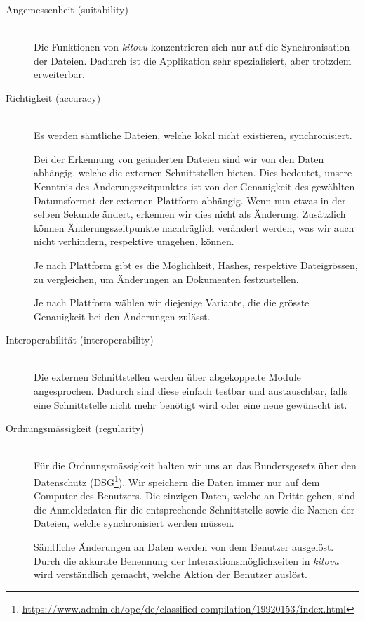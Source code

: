 \documentclass[a4paper]{article}
\begin{document}
\begin{description}
  \item[Angemessenheit (suitability)] \strut \\
    Die Funktionen von \emph{kitovu} konzentrieren sich nur auf die Synchronisation der Dateien.
    Dadurch ist die Applikation sehr spezialisiert, aber trotzdem erweiterbar.
  \item[Richtigkeit (accuracy)] \strut \\
    Es werden sämtliche Dateien, welche lokal nicht existieren, synchronisiert.

    Bei der Erkennung von geänderten Dateien sind wir von den Daten abhängig, welche die externen Schnittstellen bieten.
    Dies bedeutet, unsere Kenntnis des Änderungszeitpunktes ist von der Genauigkeit des gewählten Datumsformat der externen Plattform abhängig.
    Wenn nun etwas in der selben Sekunde ändert, erkennen wir dies nicht als Änderung.
    Zusätzlich können Änderungszeitpunkte nachträglich verändert werden, was wir auch nicht verhindern, respektive umgehen, können.
    
    Je nach Plattform gibt es die Möglichkeit, Hashes, respektive Dateigrössen, zu vergleichen, um Änderungen an Dokumenten festzustellen.
    
    Je nach Plattform wählen wir diejenige Variante, die die grösste Genauigkeit bei den Änderungen zulässt.
  \item[Interoperabilität (interoperability)] \strut \\
    Die externen Schnittstellen werden über abgekoppelte Module angesprochen.
    Dadurch sind diese einfach testbar und austauschbar, falls eine Schnittstelle nicht mehr benötigt wird oder eine neue gewünscht ist.
  \item[Ordnungsmässigkeit (regularity)] \strut \\
    Für die Ordnungsmässigkeit halten wir uns an das Bundersgesetz über den Datenschutz (DSG\footnote{\url{https://www.admin.ch/opc/de/classified-compilation/19920153/index.html}}).
    Wir speichern die Daten immer nur auf dem Computer des Benutzers.
    Die einzigen Daten, welche an Dritte gehen, sind die Anmeldedaten für die entsprechende Schnittstelle sowie die Namen der Dateien, welche synchronisiert werden müssen.

    Sämtliche Änderungen an Daten werden von dem Benutzer ausgelöst. Durch die akkurate Benennung der Interaktionsmöglichkeiten in \emph{kitovu} wird verständlich gemacht, welche Aktion der Benutzer auslöst.


\end{description}
\end{document}
